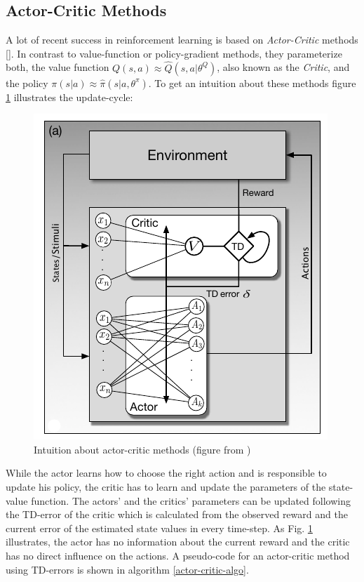 \subsection{Actor-Critic Methods}
\label{sec:actor-critic}
A lot of recent success in reinforcement learning is based on \textit{Actor-Critic} methods [\cite{konda2000actor}].
In contrast to value-function or policy-gradient methods, they parameterize both, the value function $Q(s,a) \approx \hat{Q}(s,a|\theta^Q)$, also known as the \textit{Critic}, and the policy $\pi(s|a) \approx  \hat{\pi}(s|a,\theta^\pi)$. To get an intuition about these methods figure \ref{fig:actor-critic} illustrates the update-cycle:
\begin{figure}[H]
	\centering
	\includegraphics[width=0.4\linewidth]{actor-critic}
	\caption{Intuition about actor-critic methods (figure from 
	\cite{sutton2018reinforcement})}
	\label{fig:actor-critic}
\end{figure}
While the actor learns how to choose the right action and is responsible to update his policy, the critic has to learn and update the parameters of the state-value function. The actors' and the 
critics' parameters can be updated following the TD-error of the critic which is calculated from 
the observed reward and the current error of the estimated state values in every time-step. As Fig. 
\ref{fig:actor-critic} illustrates, the actor has no information about the 
current reward and the critic has no direct influence on the actions.  
A pseudo-code for an actor-critic method using TD-errors is shown in algorithm \ref{actor-critic-algo}.

